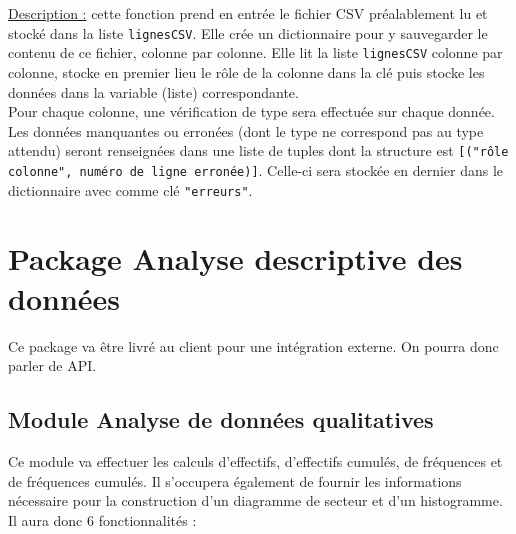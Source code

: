 \begin{enumerate}
					\underline{Description :} cette fonction prend en entrée le fichier CSV préalablement lu et stocké dans la liste \lstinline!lignesCSV!. Elle crée un dictionnaire pour y sauvegarder le contenu de ce fichier, colonne par colonne. Elle lit la liste \lstinline!lignesCSV! colonne par colonne, stocke en premier lieu le rôle de la colonne dans la clé puis stocke les données dans la variable (liste) correspondante. \\
					Pour chaque colonne, une vérification de type sera effectuée sur chaque donnée. Les données manquantes ou erronées (dont le type ne correspond pas au type attendu) seront renseignées dans une liste de tuples dont la structure est \lstinline![("rôle colonne", numéro de ligne erronée)]!. Celle-ci sera stockée en dernier dans le dictionnaire avec comme clé \lstinline!"erreurs"!.
			\end{enumerate}
	
	\section{Package Analyse descriptive des données}
	Ce package va être livré au client pour une intégration externe. On pourra donc parler de API.
	
		\subsection{Module Analyse de données qualitatives}
	Ce module va effectuer les calculs d'effectifs, d'effectifs cumulés, de fréquences et de fréquences cumulés. Il s'occupera également de fournir les informations nécessaire pour la construction d'un diagramme de secteur et d'un histogramme. Il aura donc 6 fonctionnalités :
	
